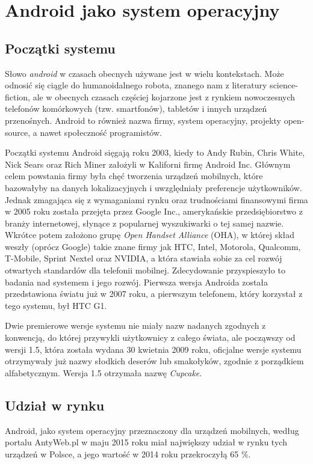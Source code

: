 \chapter{Android jako system operacyjny}

\section{Początki systemu}
Słowo \textit{android} w czasach obecnych używane jest w wielu kontekstach. Może odnosić się ciągle do humanoidalnego robota, znanego nam z literatury science-fiction, ale w obecnych czasach częściej kojarzone jest z rynkiem nowoczesnych telefonów komórkowych (tzw. smartfonów), tabletów i innych urządzeń przenośnych. Android to również nazwa firmy, system operacyjny, projekty open-source, a nawet społeczność programistów.

Początki systemu Android sięgają roku 2003, kiedy to Andy Rubin, Chris White, Nick Sears oraz Rich Miner założyli w Kaliforni firmę Android Inc. Głównym celem powstania firmy była chęć tworzenia urządzeń mobilnych, które bazowałyby na danych lokalizacyjnych i uwzględniały preferencje użytkowników. Jednak zmagająca się z wymaganiami rynku oraz trudnościami finansowymi firma w 2005 roku została przejęta przez Google Inc., amerykańskie przedsiębiorstwo z branży internetowej, słynące z popularnej wyszukiwarki o tej samej nazwie. Wkrótce potem założono grupę \textit{Open Handset Alliance} (OHA), w której skład weszły (oprócz Google) takie znane firmy jak HTC, Intel, Motorola, Qualcomm, T-Mobile, Sprint Nextel oraz NVIDIA, a która stawiała sobie za cel rozwój otwartych standardów dla telefonii mobilnej. Zdecydowanie przyspieszyło to badania nad systemem i jego rozwój. Pierwsza wersja Androida została przedstawiona światu już w 2007 roku, a pierwszym telefonem, który korzystał z tego systemu, był HTC G1.

Dwie premierowe wersje systemu nie miały nazw nadanych zgodnych z konwencją, do której przywykli użytkownicy z całego świata, ale począwszy od wersji 1.5, która została wydana 30 kwietnia 2009 roku, oficjalne wersje systemu otrzymywały już nazwy słodkich deserów lub smakołyków, zgodnie z porządkiem alfabetycznym. Wersja 1.5 otrzymała nazwę \textit{Cupcake}.

\section{Udział w rynku}
Android, jako system operacyjny przeznaczony dla urządzeń mobilnych, według portalu AntyWeb.pl w maju 2015 roku miał największy udział w rynku tych urządzeń w Polsce, a jego wartość w 2014 roku przekroczyłą 65 \%. 


